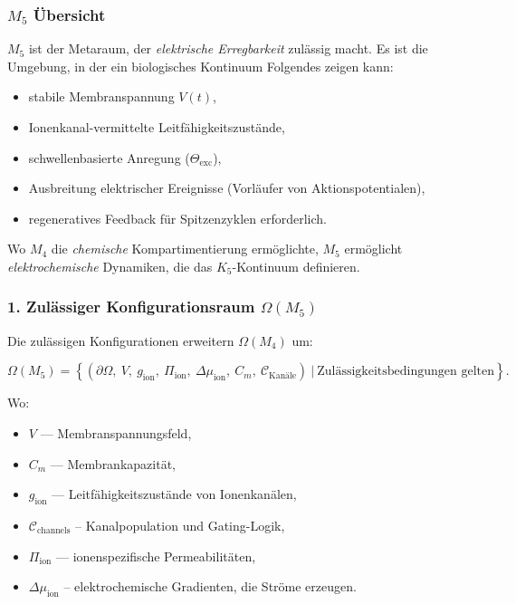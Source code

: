 

\subsubsection{\texorpdfstring{$M_5$}{M_5} Übersicht}
\label{sec:m5-overview}

$M_5$ ist der Metaraum, der \emph{elektrische Erregbarkeit} zulässig macht.
Es ist die Umgebung, in der ein biologisches Kontinuum Folgendes zeigen kann:

\begin{itemize}
    \item stabile Membranspannung $V(t)$,
    \item Ionenkanal-vermittelte Leitfähigkeitszustände,
    \item schwellenbasierte Anregung ($\Theta_{\mathrm{exc}}$),
    \item Ausbreitung elektrischer Ereignisse (Vorläufer von Aktionspotentialen),
    \item regeneratives Feedback für Spitzenzyklen erforderlich.
\end{itemize}

Wo $M_4$ die \emph{chemische} Kompartimentierung ermöglichte,
$M_5$ ermöglicht \emph{elektrochemische} Dynamiken, die das $K_5$-Kontinuum definieren.

\subsubsection*{1. Zulässiger Konfigurationsraum \texorpdfstring{$\Omega(M_5)$}{\Omega(M_5)}}

Die zulässigen Konfigurationen erweitern $\Omega(M_4)$ um:

\[
\Omega(M_5) =
\left\{
(\partial\Omega,\ V,\ g_{\mathrm{ion}},\
\Pi_{\mathrm{ion}},\
\Delta\mu_{\mathrm{ion}},\
C_m,\
\mathcal{C}_{\mathrm{Kanäle}})
\ \Big|\
\text{Zulässigkeitsbedingungen gelten}
\right\}.
\]

Wo:

\begin{itemize}
    \item $V$ — Membranspannungsfeld,
    \item $C_m$ — Membrankapazität,
    \item $g_{\mathrm{ion}}$ — Leitfähigkeitszustände von Ionenkanälen,
    \item $\mathcal{C}_{\mathrm{channels}}$ – Kanalpopulation und Gating-Logik,
    \item $\Pi_{\mathrm{ion}}$ — ionenspezifische Permeabilitäten,
    \item $\Delta\mu_{\mathrm{ion}}$ – elektrochemische Gradienten, die Ströme erzeugen.
\end{itemize}

